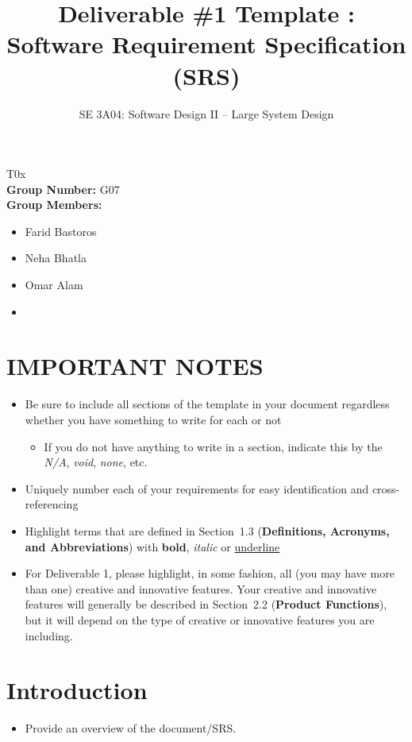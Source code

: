 \documentclass[]{article}
\title{Deliverable \#1 Template : Software Requirement Specification (SRS)}
\author{SE 3A04: Software Design II -- Large System Design}
\date{}
\begin{document}
\setlength\parindent{0pt} 
\setlength{\parskip}{\baselineskip}

\maketitle	
{} T0x\\
{\bf Group Number:} G07 \\
{\bf Group Members:} 
\begin{itemize}
	\item Farid Bastoros 
	\item Neha Bhatla
	\item Omar Alam
	\item
\end{itemize}

\section*{IMPORTANT NOTES}
\begin{itemize}
	\item Be sure to include all sections of the template in your document regardless whether you have something to write for each or not
	\begin{itemize}
		\item If you do not have anything to write in a section, indicate this by the \emph{N/A}, \emph{void}, \emph{none}, etc.
	\end{itemize}
	\item Uniquely number each of your requirements for easy identification and cross-referencing
	\item Highlight terms that are defined in Section~1.3 (\textbf{Definitions, Acronyms, and Abbreviations}) with \textbf{bold}, \emph{italic} or \underline{underline}
	\item For Deliverable 1, please highlight, in some fashion, all (you may have more than one) creative and innovative features. Your creative and innovative features will generally be described in Section~2.2 (\textbf{Product Functions}), but it will depend on the type of creative or innovative features you are including.
\end{itemize}

\newpage
\section{Introduction}
\label{sec:introduction}

\begin{itemize}
	\item Provide an overview of the document/SRS.
\end{itemize}
\end{document}
